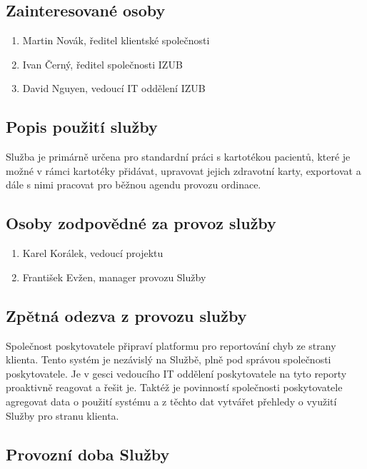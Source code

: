 \documentclass[11pt, a4paper, titlepage]{article}
\begin{document}
	\subsection*{Zainteresované osoby}
	\begin{enumerate}
		\item Martin Novák, ředitel klientské společnosti
		\item Ivan Černý, ředitel společnosti IZUB
		\item David Nguyen, vedoucí IT oddělení IZUB
	\end{enumerate}

	\subsection*{Popis použití služby}

	\noindent Služba je primárně určena pro standardní práci s kartotékou pacientů, které je možné v rámci kartotéky přidávat, upravovat jejich zdravotní karty, exportovat a dále s nimi pracovat pro běžnou agendu provozu ordinace.

	\subsection*{Osoby zodpovědné za provoz služby}
	\begin{enumerate}
		\item Karel Korálek, vedoucí projektu
		\item František Evžen, manager provozu Služby
	\end{enumerate}

	\subsection*{Zpětná odezva z provozu služby}

	\noindent Společnost poskytovatele připraví platformu pro reportování chyb ze strany klienta. Tento systém je nezávislý na Službě, plně pod správou společnosti poskytovatele. Je v gesci vedoucího IT oddělení poskytovatele na tyto reporty proaktivně reagovat a řešit je. Taktéž je povinností společnosti poskytovatele agregovat data o použití systému a z těchto dat vytvářet přehledy o využití Služby pro stranu klienta.

	\subsection*{Provozní doba Služby}
\end{document}

